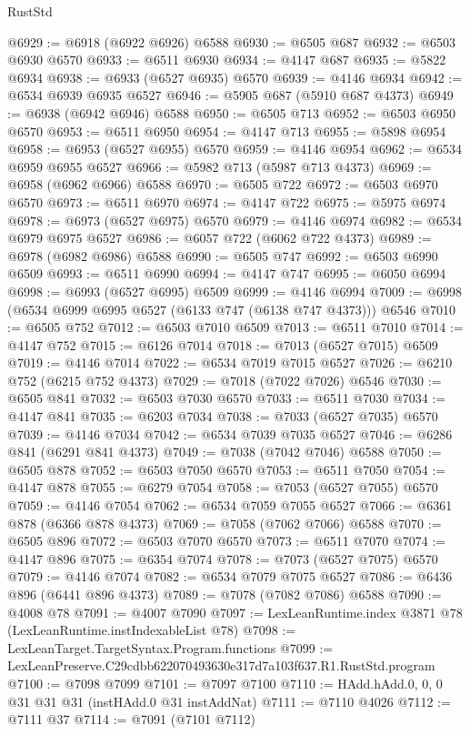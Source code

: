 \begin{lexlean}{RustStd}
\begin{coremodule}
@6929 := @6918 (@6922 @6926) @6588
@6930 := @6505 @687
@6932 := @6503 @6930 @6570
@6933 := @6511 @6930
@6934 := @4147 @687
@6935 := @5822 @6934
@6938 := @6933 (@6527 @6935) @6570
@6939 := @4146 @6934
@6942 := @6534 @6939 @6935 @6527
@6946 := @5905 @687 (@5910 @687 @4373)
@6949 := @6938 (@6942 @6946) @6588
@6950 := @6505 @713
@6952 := @6503 @6950 @6570
@6953 := @6511 @6950
@6954 := @4147 @713
@6955 := @5898 @6954
@6958 := @6953 (@6527 @6955) @6570
@6959 := @4146 @6954
@6962 := @6534 @6959 @6955 @6527
@6966 := @5982 @713 (@5987 @713 @4373)
@6969 := @6958 (@6962 @6966) @6588
@6970 := @6505 @722
@6972 := @6503 @6970 @6570
@6973 := @6511 @6970
@6974 := @4147 @722
@6975 := @5975 @6974
@6978 := @6973 (@6527 @6975) @6570
@6979 := @4146 @6974
@6982 := @6534 @6979 @6975 @6527
@6986 := @6057 @722 (@6062 @722 @4373)
@6989 := @6978 (@6982 @6986) @6588
@6990 := @6505 @747
@6992 := @6503 @6990 @6509
@6993 := @6511 @6990
@6994 := @4147 @747
@6995 := @6050 @6994
@6998 := @6993 (@6527 @6995) @6509
@6999 := @4146 @6994
@7009 := @6998 (@6534 @6999 @6995 @6527 (@6133 @747 (@6138 @747 @4373))) @6546
@7010 := @6505 @752
@7012 := @6503 @7010 @6509
@7013 := @6511 @7010
@7014 := @4147 @752
@7015 := @6126 @7014
@7018 := @7013 (@6527 @7015) @6509
@7019 := @4146 @7014
@7022 := @6534 @7019 @7015 @6527
@7026 := @6210 @752 (@6215 @752 @4373)
@7029 := @7018 (@7022 @7026) @6546
@7030 := @6505 @841
@7032 := @6503 @7030 @6570
@7033 := @6511 @7030
@7034 := @4147 @841
@7035 := @6203 @7034
@7038 := @7033 (@6527 @7035) @6570
@7039 := @4146 @7034
@7042 := @6534 @7039 @7035 @6527
@7046 := @6286 @841 (@6291 @841 @4373)
@7049 := @7038 (@7042 @7046) @6588
@7050 := @6505 @878
@7052 := @6503 @7050 @6570
@7053 := @6511 @7050
@7054 := @4147 @878
@7055 := @6279 @7054
@7058 := @7053 (@6527 @7055) @6570
@7059 := @4146 @7054
@7062 := @6534 @7059 @7055 @6527
@7066 := @6361 @878 (@6366 @878 @4373)
@7069 := @7058 (@7062 @7066) @6588
@7070 := @6505 @896
@7072 := @6503 @7070 @6570
@7073 := @6511 @7070
@7074 := @4147 @896
@7075 := @6354 @7074
@7078 := @7073 (@6527 @7075) @6570
@7079 := @4146 @7074
@7082 := @6534 @7079 @7075 @6527
@7086 := @6436 @896 (@6441 @896 @4373)
@7089 := @7078 (@7082 @7086) @6588
@7090 := @4008 @78
@7091 := @4007 @7090
@7097 := LexLeanRuntime.index @3871 @78 (LexLeanRuntime.instIndexableList @78)
@7098 := LexLeanTarget.TargetSyntax.Program.functions
@7099 := LexLeanPreserve.C29cdbb622070493630e317d7a103f637.R1.RustStd.program
@7100 := @7098 @7099
@7101 := @7097 @7100
@7110 := HAdd.hAdd.{0, 0, 0} @31 @31 @31 (instHAdd.{0} @31 instAddNat)
@7111 := @7110 @4026
@7112 := @7111 @37
@7114 := @7091 (@7101 @7112)

\end{coremodule}
\end{lexlean}
